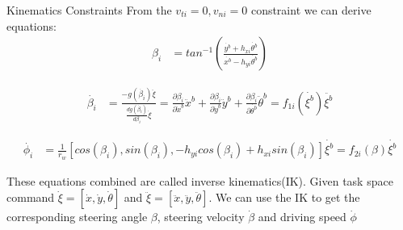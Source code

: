 \documentclass[10pt]{beamer}
\begin{document}
\begin{frame}{Kinematics Constraints}
    From the $v_{ti}=0, v_{ni}=0$ constraint we can derive equations: 
    \begin{equation}\label{eq:2}
	\begin{split}
	\beta_i &= tan^{-1}(\frac{\dot{y^b}+h_{xi}\dot{\theta^b}}{\dot{x^b}-h_{yi}\dot{\theta^b}})
	\end{split}
\end{equation}

\begin{equation}\label{eq:3}
	\begin{split}
	\dot{\beta_i} &= \frac{-g(\dot{\beta_i})\ddot{\xi}}{\frac{dg(\dot{\beta_i})}{d\beta_i}\dot{\xi}}=\frac{\partial\beta_i}{\partial\dot{x}^b}\ddot{x}^b+\frac{\partial\beta_i}{\partial\dot{y}^b}\ddot{y}^b +\frac{\partial\beta_i}{\partial\dot{\theta^b}}\ddot{\theta}^b
	=f_{1i}(\dot{\xi^b})\ddot{\xi^b}
	\end{split}
\end{equation}

\begin{equation}\label{eq:4}
	\begin{split}
	\dot{\phi_i} &= \frac{1}{r_w}[cos(\beta_i), sin(\beta_i), -h_{yi}cos(\beta_i)+h_{xi}sin(\beta_i)]\dot{\xi^b}=f_{2i}(\beta)\dot{\xi^b}
	\end{split}
\end{equation}

These equations combined are called inverse kinematics(IK). Given task space command $\dot{\xi}=[\dot{x},\dot{y},\dot{\theta}]$ and $\ddot{\xi}=[\ddot{x},\ddot{y},\ddot{\theta}]$. We can use the IK to get the corresponding steering angle $\beta$, steering velocity $\dot{\beta}$ and driving speed $\dot{\phi}$
\end{frame}
\end{document}
